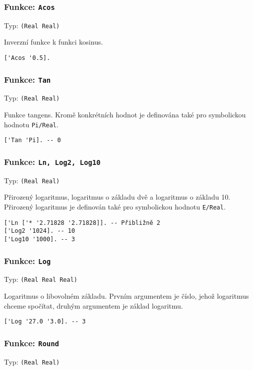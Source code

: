 \subsubsection*{Funkce: \lstinline{Acos}}
Typ: \lstinline{(Real Real)}

Inverzní funkce k funkci kosinus.

\begin{lstlisting}[caption={Ukázka využití Acos}]
['Acos '0.5].
\end{lstlisting}

\subsubsection*{Funkce: \lstinline{Tan}}
Typ: \lstinline{(Real Real)}

Funkce tangens. Kromě konkrétních hodnot je definována také pro symbolickou hodnotu
\lstinline{Pi/Real}.

\begin{lstlisting}[caption={Ukázka využití Tan}]
['Tan 'Pi]. -- 0
\end{lstlisting}

\subsubsection*{Funkce: \lstinline{Ln, Log2, Log10}}
Typ: \lstinline{(Real Real)}

Přirozený logaritmus, logaritmus o základu dvě a logaritmus o základu 10. Přirozený logaritmus
je definován také pro symbolickou hodnotu \lstinline{E/Real}.

\begin{lstlisting}[caption={Ukázka využití Ln, Log2, Log10}]
['Ln ['* '2.71828 '2.71828]]. -- Přibližně 2
['Log2 '1024]. -- 10
['Log10 '1000]. -- 3
\end{lstlisting}

\subsubsection*{Funkce: \lstinline{Log}}
Typ: \lstinline{(Real Real Real)}

Logaritmus o libovolném základu. Prvním argumentem je číslo, jehož logaritmus chceme spočítat,
druhým argumentem je základ logaritmu.

\begin{lstlisting}[caption={Ukázka využití Log}]
['Log '27.0 '3.0]. -- 3
\end{lstlisting}

\subsubsection*{Funkce: \lstinline{Round}}
Typ: \lstinline{(Real Real)}

